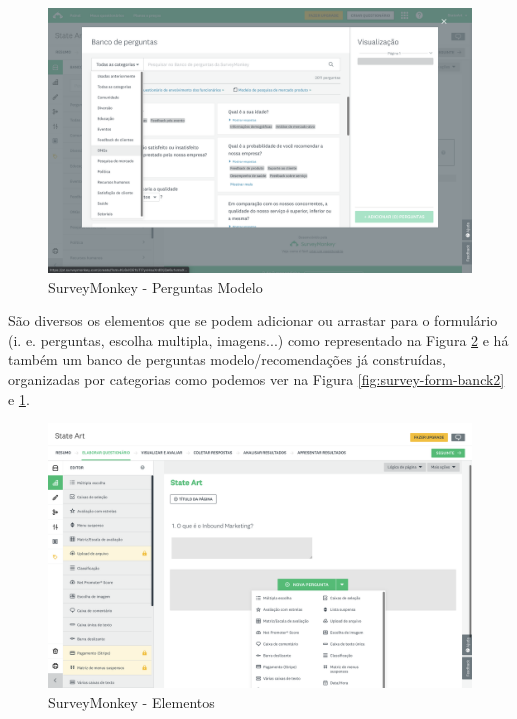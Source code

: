 \begin{figure}[ht!]
	\begin{center}
		\includegraphics[width=1\textwidth]{img/survey-form-bank1}
		\caption{SurveyMonkey - Perguntas Modelo }
		\label{fig:survey-form-banck1}
	\end{center}
\end{figure}

\newpage

São diversos os elementos que se podem adicionar ou arrastar para o formulário (i. e. perguntas, escolha multipla, imagens...) como representado na Figura \ref{fig:surveymonkey-form-element} e há também um banco de perguntas modelo/recomendações já construídas, organizadas por categorias como podemos ver na Figura \ref{fig:survey-form-banck2} e \ref{fig:survey-form-banck1}.


\begin{figure}[ht!]
	\begin{center}
		\includegraphics[width=1\textwidth]{img/surveymonkey-form-element}
		\caption{SurveyMonkey - Elementos }
		\label{fig:surveymonkey-form-element}
	\end{center}
\end{figure}
\newpage

